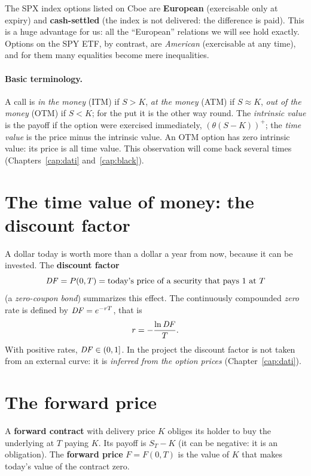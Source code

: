 The SPX index options listed on Cboe are \textbf{European} (exercisable only at expiry) and \textbf{cash-settled}
(the index is not delivered: the difference is paid). This is a huge advantage for us: all the ``European''
relations we will see hold exactly. Options on the SPY ETF, by contrast, are \emph{American} (exercisable at any
time), and for them many equalities become mere inequalities.

\paragraph{Basic terminology.} A call is \emph{in the money} (ITM) if $S>K$, \emph{at the money} (ATM) if
$S\approx K$, \emph{out of the money} (OTM) if $S<K$; for the put it is the other way round. The \emph{intrinsic
value} is the payoff if the option were exercised immediately, $(\theta(S-K))^+$; the \emph{time value} is the price
minus the intrinsic value. An OTM option has zero intrinsic value: its price is all time value. This observation will
come back several times (Chapters~\ref{cap:dati} and~\ref{cap:black}).

\section{The time value of money: the discount factor}

A dollar today is worth more than a dollar a year from now, because it can be invested. The \textbf{discount factor}
\begin{equation}
\mathit{DF} = P(0,T) = \text{today's price of a security that pays 1 at } T
\end{equation}
(a \emph{zero-coupon bond}) summarizes this effect. The continuously compounded \emph{zero} rate is defined by
$\mathit{DF}=e^{-rT}$, that is
\begin{equation}\label{eq:tasso-da-DF}
r = -\frac{\ln \mathit{DF}}{T}.
\end{equation}
With positive rates, $\mathit{DF}\in(0,1]$. In the project the discount factor is not taken from an external curve: it is
\emph{inferred from the option prices} (Chapter~\ref{cap:dati}).

\section{The forward price}

A \textbf{forward contract} with delivery price $K$ obliges its holder to buy the underlying at $T$ paying $K$. Its
payoff is $S_T-K$ (it can be negative: it is an obligation). The \textbf{forward price} $F=F(0,T)$ is the value of
$K$ that makes today's value of the contract zero.


